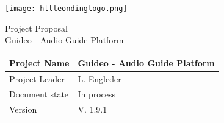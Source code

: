 \documentclass[12pt]{article}
\theoremstyle{definition}
\newcommand{\productname}{Guideo - Audio Guide Platform}
\newcommand{\projectleader}{L. Engleder}
\newcommand{\documentstatus}{  In process }
\newcommand{\version}{V. 1.9.1}
\begin{document}
\begin{titlepage}
\begin{flushright}
\texttt{[image: htlleondinglogo.png]}\\
\end{flushright}
 
\vspace{10em}
 
\begin{center}
{\Huge Project Proposal} \\[3em]
{\LARGE \productname} \\[3em]
\end{center}
 
\begin{flushleft}
\begin{tabular}{|l|l|}
\hline
Project Name & \productname \\ \hline
Project Leader & \projectleader \\ \hline
Document state & \documentstatus \\ \hline
Version & \version \\ \hline
\end{tabular}
\end{flushleft}
 
\end{titlepage}
\end{document}
